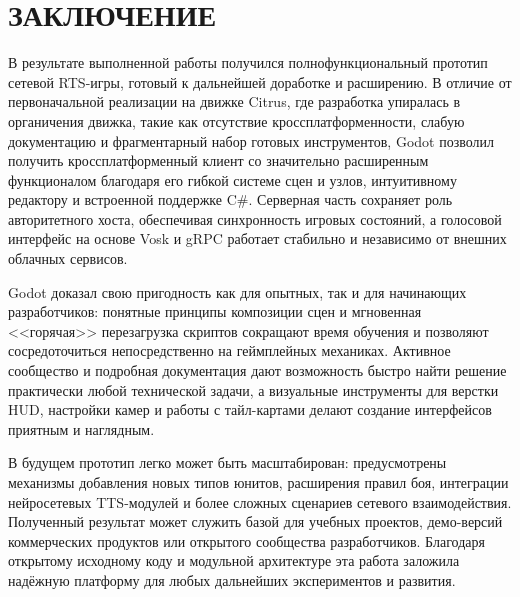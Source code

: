 \section*{ЗАКЛЮЧЕНИЕ}

В результате выполненной работы получился полнофункциональный прототип сетевой RTS-игры, готовый к дальнейшей доработке и расширению. В отличие от 
первоначальной реализации на движке Citrus, где разработка упиралась в органичения движка, такие как отсутствие кроссплатформенности, 
слабую документацию и фрагментарный набор готовых инструментов, Godot позволил получить кроссплатформенный клиент со значительно расширенным функционалом 
благодаря его гибкой системе сцен и узлов, интуитивному редактору и встроенной поддержке C\#. Серверная часть сохраняет роль авторитетного хоста, обеспечивая
синхронность игровых состояний, а голосовой интерфейс на основе Vosk и gRPC работает стабильно и независимо от внешних облачных сервисов.

Godot доказал свою пригодность как для опытных, так и для начинающих разработчиков: понятные принципы композиции сцен и мгновенная <<горячая>> перезагрузка 
скриптов сокращают время обучения и позволяют сосредоточиться непосредственно на геймплейных механиках. 
Активное сообщество и подробная документация дают возможность быстро найти решение практически любой технической задачи, а визуальные инструменты для 
верстки HUD, настройки камер и работы с тайл-картами делают создание интерфейсов приятным и наглядным.

В будущем прототип легко может быть масштабирован: предусмотрены механизмы добавления новых типов юнитов, расширения правил боя, интеграции нейросетевых 
TTS-модулей и более сложных сценариев сетевого взаимодействия. Полученный результат может служить базой для учебных проектов, демо-версий коммерческих 
продуктов или открытого сообщества разработчиков. Благодаря открытому исходному коду и модульной архитектуре эта работа заложила надёжную платформу 
для любых дальнейших экспериментов и развития.